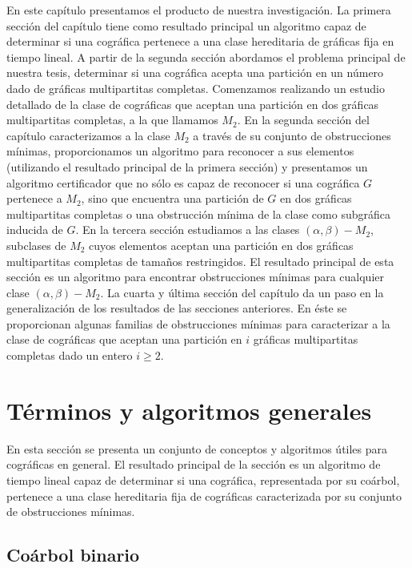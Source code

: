 En este capítulo presentamos el producto de nuestra investigación. La primera
sección del capítulo tiene como resultado principal un algoritmo capaz de
determinar si una cográfica pertenece a una clase hereditaria de gráficas fija
en tiempo lineal. A partir de la segunda sección abordamos el problema
principal de nuestra tesis, determinar si una cográfica acepta una partición en
un número dado de gráficas multipartitas completas. Comenzamos realizando un
estudio detallado de la clase de cográficas que aceptan una partición en dos
gráficas multipartitas completas, a la que llamamos $M_2$. En la segunda
sección del capítulo caracterizamos a la clase $M_2$ a través de su conjunto de
obstrucciones mínimas, proporcionamos un algoritmo para reconocer a sus
elementos (utilizando el resultado principal de la primera sección) y
presentamos un algoritmo certificador que no sólo es capaz de reconocer si una
cográfica $G$ pertenece a  $M_2$, sino que encuentra una partición de $G$ en
dos gráficas multipartitas completas o una obstrucción mínima de la clase como
subgráfica inducida de $G$. En la tercera sección estudiamos a las clases
$(\alpha, \beta)-M_2$, subclases de $M_2$ cuyos elementos aceptan una partición
en dos gráficas multipartitas completas de tamaños restringidos. El resultado
principal de esta sección es un algoritmo para encontrar obstrucciones mínimas
para cualquier clase $(\alpha, \beta)-M_2$. La cuarta y última sección del
capítulo da un paso en la generalización de los resultados de las secciones
anteriores. En éste se proporcionan algunas familias de obstrucciones mínimas
para caracterizar a la clase de cográficas que aceptan una partición en $i$
gráficas multipartitas completas dado un entero $i \geq 2$.

\section{Términos y algoritmos generales}
    En esta sección se presenta un conjunto de conceptos y algoritmos
    \'utiles para cogr\'aficas en general. El resultado
    principal de la sección es un algoritmo de tiempo lineal capaz de
    determinar si una cográfica, representada por su coárbol, pertenece a una
    clase hereditaria fija de cográficas caracterizada por su conjunto de
    obstrucciones mínimas.

    \subsection{Coárbol binario}
        
